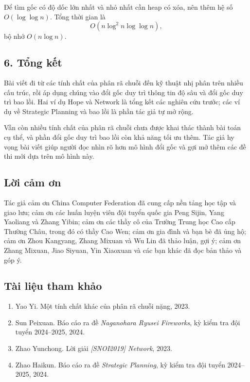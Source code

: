 \documentclass[11pt]{article}
\begin{document}
Để tìm gốc có độ dốc lớn nhất và nhỏ nhất cần heap có xóa, nên thêm hệ số
\(O(\log\log n)\). Tổng thời gian là
\[
  O(n\log^2 n\log\log n),
\]
bộ nhớ \(O(n\log n)\).

\subsection*{6. Tổng kết}

Bài viết đi từ các tính chất của phân rã chuỗi đến kỹ thuật nhị phân trên nhiều
cấu trúc, rồi áp dụng chúng vào đổi gốc duy trì thông tin độ sâu và đổi gốc
duy trì bao lồi. Hai ví dụ Hope và Network là tổng kết các nghiên cứu trước;
các ví dụ về Strategic Planning và bao lồi là phần tác giả tự mở rộng.

Vẫn còn nhiều tính chất của phân rã chuỗi chưa được khai thác thành bài toán
cụ thể, và phần đổi gốc duy trì bao lồi còn khả năng tối ưu thêm. Tác giả hy
vọng bài viết giúp người đọc nhìn rõ hơn mô hình đổi gốc và gợi mở thêm các đề
thi mới dựa trên mô hình này.

\subsection*{Lời cảm ơn}

Tác giả cảm ơn China Computer Federation đã cung cấp nền tảng học tập và giao
lưu; cảm ơn các huấn luyện viên đội tuyển quốc gia Peng Sijin, Yang Yaoliang
và Zhang Yibin; cảm ơn các thầy cô của Trường Trung học Cao cấp Thường Châu,
trong đó có thầy Cao Wen; cảm ơn gia đình và bạn bè đã ủng hộ; cảm ơn Zhou
Kangyang, Zhang Mixuan và Wu Lin đã thảo luận, gợi ý; cảm ơn Zhang Mixuan,
Jiao Siyuan, Yin Xiaoxuan và các bạn khác đã đọc bản thảo và góp ý.

\subsection*{Tài liệu tham khảo}

\begin{enumerate}
  \item Yao Yi. Một tính chất khác của phân rã chuỗi nặng, 2023.
  \item Sun Peixuan. Báo cáo ra đề \emph{Naganohara Ryusei Fireworks}, kỳ kiểm
  tra đội tuyển 2024--2025, 2024.
  \item Zhao Yunchong. Lời giải \emph{[SNOI2019] Network}, 2023.
  \item Zhao Haikun. Báo cáo ra đề \emph{Strategic Planning}, kỳ kiểm tra đội
  tuyển 2024--2025, 2024.
\end{enumerate}
\end{document}
